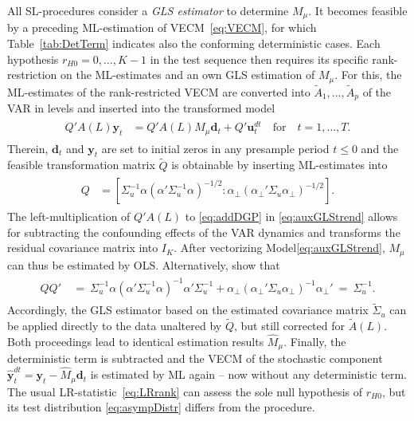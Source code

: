 All SL-procedures consider a \textit{GLS estimator} to determine $ M_\mu $. It becomes feasible by a preceding ML-estimation of VECM~\eqref{eq:VECM}, for which Table~\ref{tab:DetTerm} indicates also the conforming deterministic cases. Each hypothesis $ r_{H0} = 0,\ldots,K-1 $ in the test sequence then requires its specific rank-restriction on the ML-estimates and an own GLS estimation of $ M_\mu $. For this, the ML-estimates of the rank-restricted VECM are converted into $ \widetilde{A}_1, \ldots , \widetilde{A}_p $ of the VAR in levels and inserted into the transformed model
\begin{align} \label{eq:auxGLStrend}
\begin{split}
	{Q}' {A}(L) \boldsymbol{y}_t & = {Q}' {A}(L) M_\mu \boldsymbol{d}_t + {Q}' \boldsymbol{u}^{d \! t}_{t} \quad \text{for} \quad t=1,\ldots,T.
\end{split}
\end{align}
Therein, $ \boldsymbol{d}_t $ and $ \boldsymbol{y}_{t} $ are set to initial zeros in any presample period $ t \leq 0 $ and the feasible transformation matrix $ \widetilde{Q} $ is obtainable by inserting ML-estimates into
\begin{align} \label{eq:GLStrend}
\begin{split}
	Q & = \left[ \Sigma_u^{-1} \alpha \left( \alpha' \Sigma_u^{-1} \alpha \right)^{-1/2} : \alpha_\perp \left( \alpha_\perp' \Sigma_u \alpha_\perp \right)^{-1/2} \right].
\end{split}
\end{align}
The left-multiplication of $ {Q}' {A}(L) $ to \eqref{eq:addDGP} in \eqref{eq:auxGLStrend} allows for subtracting the confounding effects of the VAR dynamics and transforms the residual covariance matrix into $ I_K $. After vectorizing Model\eqref{eq:auxGLStrend}, $ M_\mu $ can thus be estimated by OLS. Alternatively, \citet[p. 438]{SaikkonenLutkepohl2000c} show that 
\begin{align} \label{eq:GLStrend2}
\begin{split}
	QQ' & \ = \ \Sigma_u^{-1} \alpha \left( \alpha' \Sigma_u^{-1} \alpha \right)^{-1} \alpha' \Sigma_u^{-1} + \alpha_\perp \left( \alpha_\perp' \Sigma_u \alpha_\perp \right)^{-1} \alpha_\perp' \ = \ \Sigma_u^{-1}.
\end{split}
\end{align} 
Accordingly, the GLS estimator based on the estimated covariance matrix $ \widetilde{\Sigma}_u $ can be applied directly to the data unaltered by $ \widetilde{Q} $, but still corrected for $ \widetilde{A}(L) $. Both proceedings lead to identical estimation results $ \widehat{M}_\mu $. Finally, the deterministic term is subtracted and the VECM of the stochastic component $ \boldsymbol{\hat{y}}^{d \! t}_{t} = \boldsymbol{y}_t - \widehat{M}_\mu \boldsymbol{d}_t $ is estimated by ML again -- now without any deterministic term. The usual LR-statistic~\eqref{eq:LRrank} can assess the sole null hypothesis of $ r_{H0} $, but its test distribution \eqref{eq:asympDistr} differs from the \citeauthor{Johansen1988} procedure.


